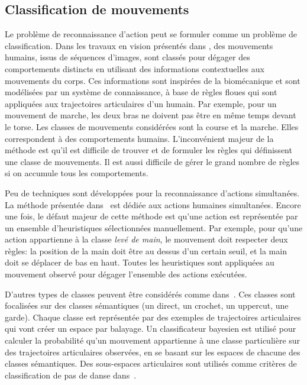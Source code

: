 \subsection{Classification de mouvements}
Le problème de reconnaissance d'action peut se formuler comme un problème de classification.
Dans les travaux en vision présentés dans \cite{chan07}, 
des mouvements humains, issus de séquences d'images, sont classés pour dégager des comportements distincts
en utilisant des informations contextuelles aux mouvements du corps.
Ces informations sont inspirées de la biomécanique et sont
modélisées par un système de connaissance, à base de règles floues qui sont
appliquées aux trajectoires articulaires d'un humain.  Par
exemple, pour un mouvement de marche, les deux bras ne doivent pas être
en même temps devant le torse. Les classes de mouvements considérées sont 
la course et la marche. Elles correspondent à des comportements humains.
L'inconvénient majeur de la méthode est qu'il est difficile de trouver et de formuler
les règles qui définissent une classe de mouvements. Il est aussi 
difficile de gérer le grand nombre de règles si on accumule
tous les comportements.

Peu de techniques sont développées pour la reconnaissance d'actions simultanées.
La méthode présentée dans~\cite{mori02} est dédiée aux actions humaines simultanées.
Encore une fois, le défaut majeur de cette méthode est qu'une action est représentée 
par un ensemble d'heuristiques sélectionnées manuellement.
Par exemple, pour qu'une action appartienne à la classe \emph{levé de main},
le mouvement doit respecter deux règles: la position de la main doit être au
dessus d'un certain seuil, et la main doit se déplacer de bas en haut.
Toutes les heuristiques sont appliquées au mouvement observé pour dégager l'ensemble
des actions exécutées.

D'autres types de classes peuvent être considérés comme dans~\cite{drumwright03, jenkins04}. Ces classes
sont focalisées sur des classes sémantiques (un direct, un crochet, un uppercut, une garde).
Chaque classe est représentée par des exemples de trajectoires articulaires qui 
vont créer un espace par balayage.
Un classificateur bayesien est utilisé pour calculer la probabilité qu'un mouvement appartienne à une
classe particulière sur des trajectoires articulaires observées, en se basant sur les
espaces de chacune des classes sémantiques.
Des sous-espaces articulaires sont utilisés comme critères de classification
de pas de danse dans~\cite{campbell95}.

